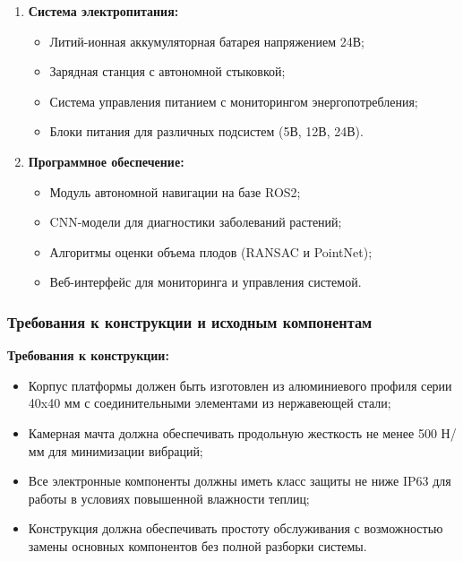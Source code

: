 \documentclass[12pt,a4paper]{article}
\begin{document}
\begin{enumerate}
\item \textbf{Система электропитания:}
   \begin{itemize}
   \item Литий-ионная аккумуляторная батарея напряжением 24В;
   \item Зарядная станция с автономной стыковкой;
   \item Система управления питанием с мониторингом энергопотребления;
   \item Блоки питания для различных подсистем (5В, 12В, 24В).
   \end{itemize}

\item \textbf{Программное обеспечение:}
   \begin{itemize}
   \item Модуль автономной навигации на базе ROS2;
   \item CNN-модели для диагностики заболеваний растений;
   \item Алгоритмы оценки объема плодов (RANSAC и PointNet);
   \item Веб-интерфейс для мониторинга и управления системой.
   \end{itemize}
\end{enumerate}

\subsubsection{Требования к конструкции и исходным компонентам}

\textbf{Требования к конструкции:}
\begin{itemize}
\item Корпус платформы должен быть изготовлен из алюминиевого профиля серии 40x40 мм с соединительными элементами из нержавеющей стали;
\item Камерная мачта должна обеспечивать продольную жесткость не менее 500 Н/мм для минимизации вибраций;
\item Все электронные компоненты должны иметь класс защиты не ниже IP63 для работы в условиях повышенной влажности теплиц;
\item Конструкция должна обеспечивать простоту обслуживания с возможностью замены основных компонентов без полной разборки системы.
\end{itemize}
\end{document}
